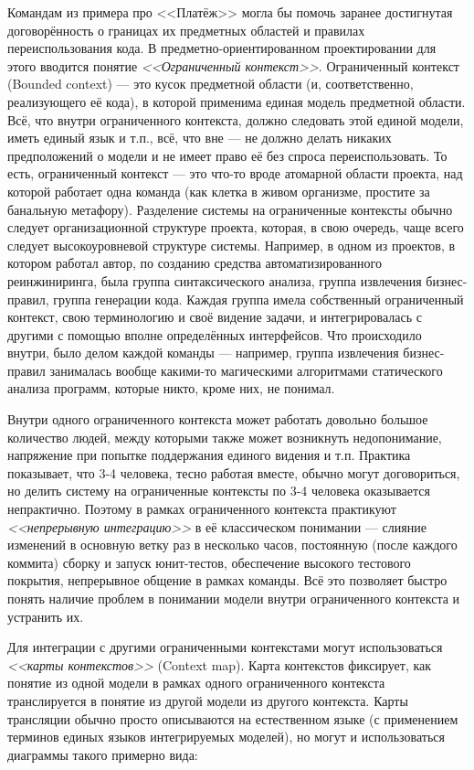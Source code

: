 \documentclass[a5paper]{article}
\begin{document}
Командам из примера про <<Платёж>> могла бы помочь заранее достигнутая договорённость о границах их предметных областей и правилах переиспользования кода. В предметно-ориентированном проектировании для этого вводится понятие \textit{<<Ограниченный контекст>>}. Ограниченный контекст (Bounded context) --- это кусок предметной области (и, соответственно, реализующего её кода), в которой применима единая модель предметной области. Всё, что внутри ограниченного контекста, должно следовать этой единой модели, иметь единый язык и т.п., всё, что вне --- не должно делать никаких предположений о модели и не имеет право её без спроса переиспользовать. То есть, ограниченный контекст --- это что-то вроде атомарной области проекта, над которой работает одна команда (как клетка в живом организме, простите за банальную метафору). Разделение системы на ограниченные контексты обычно следует организационной структуре проекта, которая, в свою очередь, чаще всего следует высокоуровневой структуре системы. Например, в одном из проектов, в котором работал автор, по созданию средства автоматизированного реинжиниринга, была группа синтаксического анализа, группа извлечения бизнес-правил, группа генерации кода. Каждая группа имела собственный ограниченный контекст, свою терминологию и своё видение задачи, и интегрировалась с другими с помощью вполне определённых интерфейсов. Что происходило внутри, было делом каждой команды --- например, группа извлечения бизнес-правил занималась вообще какими-то магическими алгоритмами статического анализа программ, которые никто, кроме них, не понимал.

Внутри одного ограниченного контекста может работать довольно большое количество людей, между которыми также может возникнуть недопонимание, напряжение при попытке поддержания единого видения и т.п. Практика показывает, что 3-4 человека, тесно работая вместе, обычно могут договориться, но делить систему на ограниченные контексты по 3-4 человека оказывается непрактично. Поэтому в рамках ограниченного контекста практикуют \textit{<<непрерывную интеграцию>>} в её классическом понимании --- слияние изменений в основную ветку раз в несколько часов, постоянную (после каждого коммита) сборку и запуск юнит-тестов, обеспечение высокого тестового покрытия, непрерывное общение в рамках команды. Всё это позволяет быстро понять наличие проблем в понимании модели внутри ограниченного контекста и устранить их.

Для интеграции с другими ограниченными контекстами могут использоваться \textit{<<карты контекстов>>} (Context map). Карта контекстов фиксирует, как понятие из одной модели в рамках одного ограниченного контекста транслируется в понятие из другой модели из другого контекста. Карты трансляции обычно просто описываются на естественном языке (с применением терминов единых языков интегрируемых моделей), но могут и использоваться диаграммы такого примерно вида:
\end{document}
